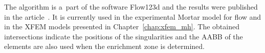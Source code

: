 The algorithm is a~part of the software Flow123d and the results were published in the article~\cite{brezina_2017}.
It is currently used in the experimental Mortar model for flow
and in the XFEM models presented in Chapter~\ref{chap:xfem_mh}. The obtained intersections indicate
the positions of the singularities and the AABB of the elements are also used when the enrichment zone is determined.




% 


